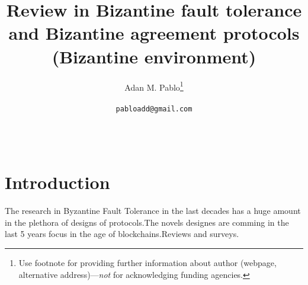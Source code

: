 \documentclass{article}
\title{Review in Bizantine fault tolerance and Bizantine agreement protocols (Bizantine environment)}
\author{
  Adan M. Pablo\thanks{Use footnote for providing further
    information about author (webpage, alternative
    address)---\emph{not} for acknowledging funding agencies.} \\
 \\\texttt{pabloadd@gmail.com} \\
   \And
\\
\\
}
\begin{document}
\maketitle

\begin{abstract}


\end{abstract}




\section{Introduction}
The research in Byzantine Fault Tolerance in the last decades has a huge amount in the plethora of designs of protocols.The novels designes  are comming in the last 5 years focus in the age of blockchains.Reviews and surveys. \cite{Barborak:1993:CPF:152610.152612}\cite{Elnozahy:2002:SRP:568522.568525}\cite{Wang2019AnotherLA}
\end{document}
